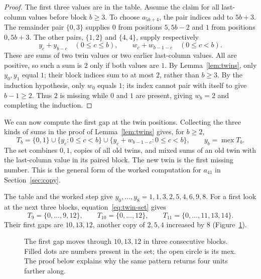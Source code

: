 \documentclass[11pt]{amsart}
\theoremstyle{remark}
\DeclareMathOperator{\mex}{mex}
\begin{document}
\begin{proof}
The first three values are in the table. Assume the claim for all last-column values before block $b\ge3$. To choose $a_{5b+4}$, the pair indices add to $5b+3$. The remainder pair $\{0,3\}$ supplies $0$ from positions $5,5b-2$ and $1$ from positions $0,5b+3$. The other pairs, $\{1,2\}$ and $\{4,4\}$, supply respectively
\[
 y_c+y_{b-c}\quad(0\le c\le b),\qquad
 w_c+w_{b-1-c}\quad(0\le c<b).
\]
These are sums of two twin values or two earlier last-column values. All are positive, so such a sum is $2$ only if both values are $1$. By Lemma~\ref{lem:twins}, only $y_0,y_1$ equal $1$; their block indices sum to at most $2$, rather than $b\ge3$. By the induction hypothesis, only $w_0$ equals $1$; its index cannot pair with itself to give $b-1\ge2$. Thus $2$ is missing while $0$ and $1$ are present, giving $w_b=2$ and completing the induction.
\end{proof}

We can now compute the first gap at the twin positions. Collecting the three kinds of sums in the proof of Lemma~\ref{lem:twins} gives, for $b\ge2$,
\begin{equation}\label{eq:twin-set}
 T_b=\{0,1\}\cup\{y_c:0\le c<b\}\cup\{y_c+w_{b-1-c}:0\le c<b\},\qquad y_b=\mex T_b.
\end{equation}
The set combines $0,1$, copies of all old twins, and mixed sums of an old twin with the last-column value in its paired block. The new twin is the first missing number. This is the general form of the worked computation for $a_{41}$ in Section~\ref{sec:copy}.

The table and the worked step give $y_0,\ldots,y_8=1,1,3,2,5,4,6,9,8$. For a first look at the next three blocks, equation~\eqref{eq:twin-set} gives
\[
 T_9=\{0,\ldots,9,12\},\qquad
 T_{10}=\{0,\ldots,12\},\qquad
 T_{11}=\{0,\ldots,11,13,14\}.
\]
Their first gaps are $10,13,12$, another copy of $2,5,4$ increased by $8$ (Figure~\ref{fig:three-gaps}).

\begin{figure}[H]
\centering
{}
\caption{The first gap moves through $10,13,12$ in three consecutive blocks. Filled dots are numbers present in the set; the open circle is its mex. The proof below explains why the same pattern returns four units farther along.}
\label{fig:three-gaps}
\end{figure}
\end{document}
